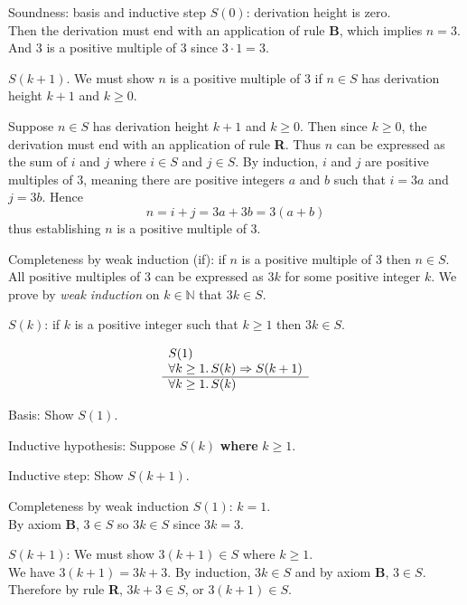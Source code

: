 \documentclass[style=sailor,size=12pt]{powerdot}
\newcommand{\bb}[1]{\mathbb{#1}}
\newcommand{\N}{\bb{N}}
\begin{document}
\begin{wideslide}[bm=,toc=]{Soundness: basis and inductive step}
{\em $S(0)$\/}: derivation height is zero. \\ 
Then the derivation must end with an
application of rule {\bf B}, which implies $n=3$.
And 3 is a positive multiple of 3 since $3\cdot 1=3$.

\vspace{1em}
{\em $S(k + 1)$}.
We must show $n$ is a positive multiple of 3 if $n\in S$ has derivation height $k+1$ and $k\geq 0$.

\vspace{1em}
Suppose $n\in S$ has derivation height $k+1$ and $k\geq 0$.
Then since $k\geq 0$, the derivation must end with an application of rule {\bf R}.
Thus $n$ can be expressed as the sum of $i$ and $j$ where $i\in S$ and $j\in S$.
By induction, $i$ and $j$ are positive multiples of $3$, meaning there are positive integers
$a$ and $b$ such that $i=3a$ and $j=3b$.
Hence 
\[n = i + j = 3a + 3b = 3(a+b)
\]
thus establishing $n$ is a positive multiple of 3.
\end{wideslide}

\begin{wideslide}[bm=,toc=]{Completeness by weak induction}
(if): if $n$ is a positive multiple of 3 then $n\in S$.
All positive multiples of 3 can be expressed as $3k$ for some positive integer $k$.
We prove by {\em weak induction\/} on $k \in \N$ that $3k\in S$.


\vspace{1em}
$S(k)$: if $k$ is a positive integer such that $k\geq 1$ then $3k\in S$.

\begin{displaymath}
\begin{array}[t]{l}
S(1) \\
\forall k\geq 1.\, S(k)\Rightarrow S(k+1) \\
\hline
\forall k\geq 1.\, S(k)
\end{array}
\end{displaymath}

\vspace{1em}
Basis: Show $S(1)$.

\vspace{1em}
Inductive hypothesis: Suppose $S(k)$ {\bf where} $k\geq 1$.

\vspace{1em} 
Inductive step: Show $S(k+1)$.
\end{wideslide}

\begin{wideslide}[bm=,toc=]{Completeness by weak induction}
{\em $S(1)$\/}: $k=1$.\\  
\vspace{1em}
By axiom {\bf B}, $3\in S$ so $3k\in S$ since $3k = 3$.

\vspace{2em}
{\em $S(k + 1)$}:
We must show $3(k+1)\in S$ where $k\geq 1$.\\
\vspace{1em}
We have $3(k+1) = 3k + 3$.
By induction, $3k\in S$ and by axiom {\bf B}, $3\in S$.
Therefore by rule {\bf R}, $3k + 3\in S$, or $3(k+1)\in S$.
\end{wideslide}
\end{document}
